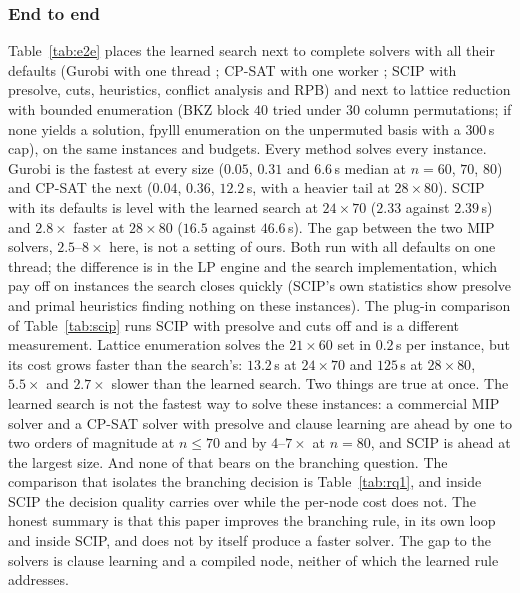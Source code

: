 \documentclass[final,5p,times,twocolumn,authoryear]{elsarticle}
\begin{document}


\subsubsection{End to end}
Table~\ref{tab:e2e} places the learned search next to complete solvers with all their defaults (Gurobi with one thread \citep{gurobi2024}; CP-SAT with one worker \citep{perron2023ortools}; SCIP with presolve, cuts, heuristics, conflict analysis and RPB) and next to lattice reduction with bounded enumeration (BKZ block $40$ tried under $30$ column permutations; if none yields a solution, fpylll enumeration \citep{fpylll2023} on the unpermuted basis with a $300$\,s cap), on the same instances and budgets. Every method solves every instance. Gurobi is the fastest at every size ($0.05$, $0.31$ and $6.6$\,s median at $n=60$, $70$, $80$) and CP-SAT the next ($0.04$, $0.36$, $12.2$\,s, with a heavier tail at $28\times80$). SCIP with its defaults is level with the learned search at $24\times70$ ($2.33$ against $2.39$\,s) and $2.8\times$ faster at $28\times80$ ($16.5$ against $46.6$\,s). The gap between the two MIP solvers, $2.5$--$8\times$ here, is not a setting of ours. Both run with all defaults on one thread; the difference is in the LP engine and the search implementation, which pay off on instances the search closes quickly (SCIP's own statistics show presolve and primal heuristics finding nothing on these instances). The plug-in comparison of Table~\ref{tab:scip} runs SCIP with presolve and cuts off and is a different measurement. Lattice enumeration solves the $21\times60$ set in $0.2$\,s per instance, but its cost grows faster than the search's: $13.2$\,s at $24\times70$ and $125$\,s at $28\times80$, $5.5\times$ and $2.7\times$ slower than the learned search.
Two things are true at once. The learned search is not the fastest way to solve these instances: a commercial MIP solver and a CP-SAT solver with presolve and clause learning are ahead by one to two orders of magnitude at $n\le70$ and by $4$--$7\times$ at $n=80$, and SCIP is ahead at the largest size. And none of that bears on the branching question. The comparison that isolates the branching decision is Table~\ref{tab:rq1}, and inside SCIP the decision quality carries over while the per-node cost does not. The honest summary is that this paper improves the branching rule, in its own loop and inside SCIP, and does not by itself produce a faster solver. The gap to the solvers is clause learning and a compiled node, neither of which the learned rule addresses.
\end{document}
